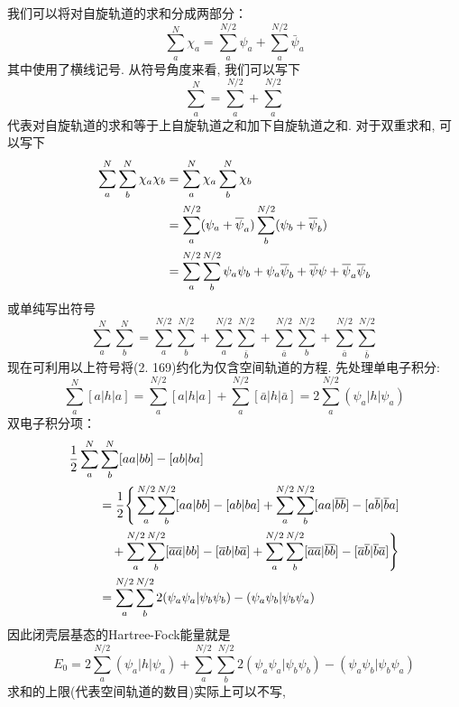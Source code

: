 我们可以将对自旋轨道的求和分成两部分：
\begin{equation}
\sum_{a}^{N} \chi_a = \sum_{a}^{N/2}\psi_a + \sum_{a}^{N/2}\bar{\psi}_a
\end{equation} 
其中使用了横线记号. 
从符号角度来看, 
我们可以写下
\begin{equation}
\sum_{a}^{N} = \sum_{a}^{N/2} + \sum_{a}^{N/2}
\end{equation}
代表对自旋轨道的求和等于上自旋轨道之和加下自旋轨道之和. 
对于双重求和, 
可以写下
\begin{align}
\sum_{a}^{N}\sum_{b}^{N}\chi_a\chi_b & = \sum_{a}^{N}\chi_a\sum_{b}^{N}\chi_b\notag\\
& = \sum_{a}^{N/2}(\psi_a + \bar{\psi}_a)\sum_{b}^{N/2}(\psi_b + \bar{\psi}_b) \notag\\ 
& = \sum_{a}^{N/2}\sum_{b}^{N/2}\psi_a\psi_b + \psi_a\bar{\psi}_b + \bar{\psi}{\psi} + \bar{\psi}_a\bar{\psi}_b 
\end{align}
或单纯写出符号
\begin{equation}
\sum_{a}^{N}\sum_{b}^{N} = \sum_{a}^{N/2}\sum_{b}^{N/2} + \sum_{a}^{N/2}\sum_{\bar{b}}^{N/2} + \sum_{\bar{a}}^{N/2}\sum_{b}^{N/2} + \sum_{\bar{a}}^{N/2}\sum_{\bar{b}}^{N/2}
\end{equation}
现在可利用以上符号将(2.
169)约化为仅含空间轨道的方程. 
先处理单电子积分:
\begin{equation}
\sum_{a}^{N}[a|h|a] = \sum_{a}^{N/2}[a|h|a] + \sum_{a}^{N/2}[\bar{a}|h|\bar{a}] = 2 \sum_{a}^{N/2}(\psi_a|h|\psi_a)
\end{equation}
双电子积分项：
\begin{align}
\frac{1}{2}\sum_{a}^{N} & \sum_{b}^{N}[aa|bb] - [ab|ba]\notag\\
& = \frac{1}{2}\Bigg\{ \sum_{a}^{N/2}\sum_{b}^{N/2}[aa|bb]-[ab|ba] + \sum_{a}^{N/2}\sum_{b}^{N/2}[aa|\bar{bb}] -[a\bar{b}|\bar{b}a]\notag \\   
& \quad + \sum_{a}^{N/2}\sum_{b}^{N/2}[\bar{aa}|bb] - [\bar{a}b|b\bar{a}] + \sum_{a}^{N/2}\sum_{b}^{N/2}[\bar{aa}|\bar{bb}] - [\bar{a}\bar{b}|\bar{b}\bar{a}] \Bigg\}\notag\\
& = \sum_{a}^{N/2}\sum_{b}^{N/2} 2 (\psi_a\psi_a|\psi_b\psi_b) - (\psi_a\psi_b|\psi_b\psi_a)
\end{align}
因此闭壳层基态的Hartree-Fock能量就是
\begin{equation}
E_0 = 2 \sum_{a}^{N/2}(\psi_a|h|\psi_a) + \sum_{a}^{N/2}\sum_{b}^{N/2}2(\psi_a\psi_a|\psi_b\psi_b) - (\psi_a\psi_b|\psi_b\psi_a)
\end{equation}
求和的上限(代表空间轨道的数目)实际上可以不写, 

